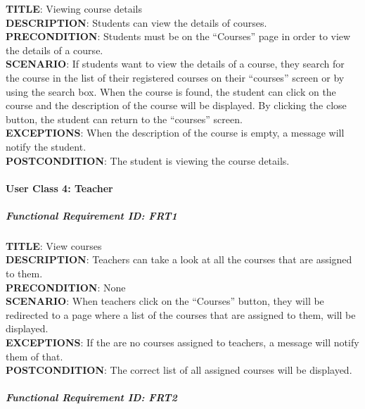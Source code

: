 \documentclass[12pt]{article}
\begin{document}
\textbf{TITLE}: Viewing course details\\\textbf{DESCRIPTION}: Students
can view the details of courses.\\\textbf{PRECONDITION}: Students must
be on the ``Courses'' page in order to view the details of a
course.\\\textbf{SCENARIO}: If students want to view the details of a
course, they search for the course in the list of their registered
courses on their ``courses'' screen or by using the search box. When the
course is found, the student can click on the course and the description
of the course will be displayed. By clicking the close button, the
student can return to the ``courses'' screen.\\\textbf{EXCEPTIONS}: When
the description of the course is empty, a message will notify the
student.\\\textbf{POSTCONDITION}: The student is viewing the course
details.

\paragraph{User Class 4: Teacher}\label{user-class-4-teacher}

\subparagraph{Functional Requirement \textbf{ID}:
FRT1}\label{functional-requirement-id-frt1}

\textbf{TITLE}: View courses\\\textbf{DESCRIPTION}: Teachers can take a
look at all the courses that are assigned to
them.\\\textbf{PRECONDITION}: None\\\textbf{SCENARIO}: When teachers
click on the ``Courses'' button, they will be redirected to a page where
a list of the courses that are assigned to them, will be
displayed.\\\textbf{EXCEPTIONS}: If the are no courses assigned to
teachers, a message will notify them of that.\\\textbf{POSTCONDITION}:
The correct list of all assigned courses will be displayed.

\subparagraph{Functional Requirement \textbf{ID}:
FRT2}\label{functional-requirement-id-frt2}
\end{document}

